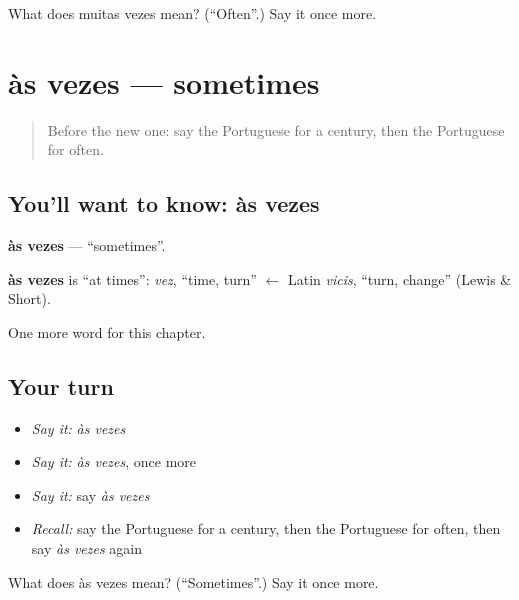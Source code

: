 \begin{tcolorbox}[breakable,colback=teal!4,colframe=teal!35!black,title={Before you move on}]
What does muitas vezes mean? (\textquotedblleft{}Often\textquotedblright{}.) Say it once more.
\end{tcolorbox}
\section[às vezes]{às vezes — sometimes}

\label{lesson:PT-C129-as-vezes}



\begin{quote}
Before the new one: say the Portuguese for a century, then the Portuguese for often.
\end{quote}

\subsection*{You'll want to know: às vezes}
\textbf{às vezes} — \textquotedblleft{}sometimes\textquotedblright{}.

\begin{cousinweb}
\textbf{às vezes} is \textquotedblleft{}at times\textquotedblright{}: \emph{vez}, \textquotedblleft{}time, turn\textquotedblright{} $\leftarrow$ Latin \emph{vicis}, \textquotedblleft{}turn, change\textquotedblright{} (Lewis \& Short).
\end{cousinweb}

\begin{grammarlens}[title={What you've built}]
One more word for this chapter.
\end{grammarlens}

\subsection*{Your turn}
\begin{itemize}
\raggedright
  \item \emph{Say it:} \emph{às vezes}
  \item \emph{Say it:} \emph{às vezes}, once more
  \item \emph{Say it:} say \emph{às vezes}
  \item \emph{Recall:} say the Portuguese for a century, then the Portuguese for often, then say \emph{às vezes} again
\end{itemize}

\begin{tcolorbox}[breakable,colback=teal!4,colframe=teal!35!black,title={Before you move on}]
What does às vezes mean? (\textquotedblleft{}Sometimes\textquotedblright{}.) Say it once more.
\end{tcolorbox}
